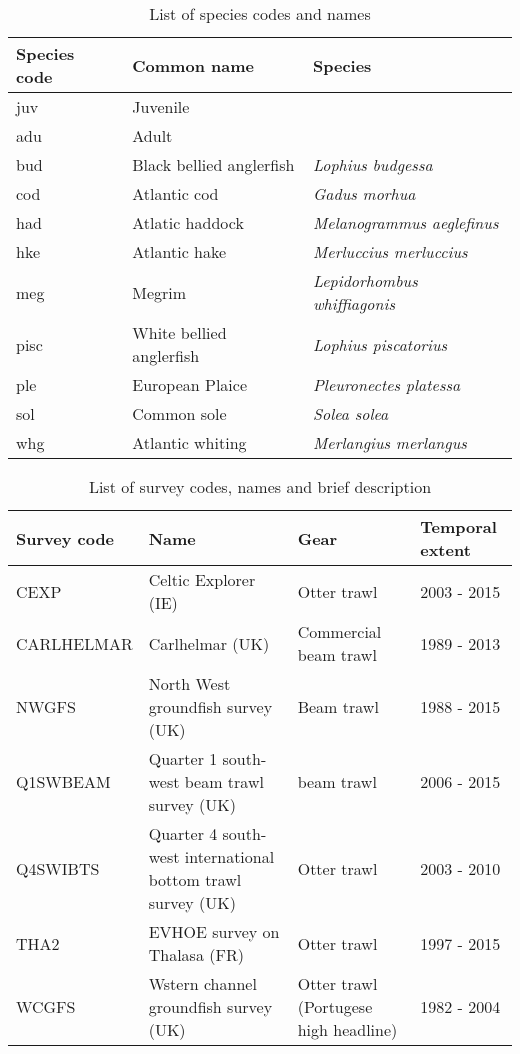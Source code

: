 \documentclass[11pt]{article}
\begin{document}
\begin{table}[!ht]
	\caption{List of species codes and names}
	\center
	\begin{tabular}{ p{3cm} p{4cm} p{5cm} }
		\hline
		Species code & Common name              & Species \\
		\hline
		juv          & Juvenile                 & \\
		adu          & Adult                    & \\
		\hline
		bud          & Black bellied anglerfish & \textit{Lophius budgessa} \\
		cod          & Atlantic cod             & \textit{Gadus morhua} \\
		had          & Atlatic haddock          & \textit{Melanogrammus aeglefinus} \\
		hke          & Atlantic hake            & \textit{Merluccius merluccius} \\
		meg          & Megrim                   & \textit{Lepidorhombus whiffiagonis} \\
		pisc         & White bellied anglerfish & \textit{Lophius piscatorius}	\\
		ple          & European Plaice          & \textit{Pleuronectes platessa} \\
		sol          & Common sole              & \textit{Solea solea} \\
		whg          & Atlantic whiting         & \textit{Merlangius merlangus} \\
		\hline
	\end{tabular}
\end{table}

\newpage

\begin{table}[!ht]
	\caption{List of survey codes, names and brief description}
	\center
	\begin{tabular}{ p{3cm} p{4cm} p{4cm} p{2cm} }
		\hline
		Survey code    & Name 	& Gear & Temporal extent \\
		\hline
		CEXP           & Celtic Explorer (IE)   & Otter trawl & 2003 - 2015 \\
		CARLHELMAR     & Carlhelmar (UK)	& Commercial beam trawl & 1989 - 2013 \\
		NWGFS          & North West groundfish survey (UK) & Beam trawl & 1988 - 2015 \\
		Q1SWBEAM       & Quarter 1 south-west beam trawl survey (UK) 	& beam trawl & 2006 - 2015 \\
		Q4SWIBTS       & Quarter 4 south-west international bottom trawl survey (UK) & Otter trawl & 2003 - 2010 \\
		THA2           & EVHOE survey on Thalasa (FR) & Otter trawl & 1997 - 2015 \\
		WCGFS          & Wstern channel groundfish survey (UK) & Otter
		trawl (Portugese high headline) & 1982 - 2004 \\
		\hline
	\end{tabular}
\end{table}
\end{document}
